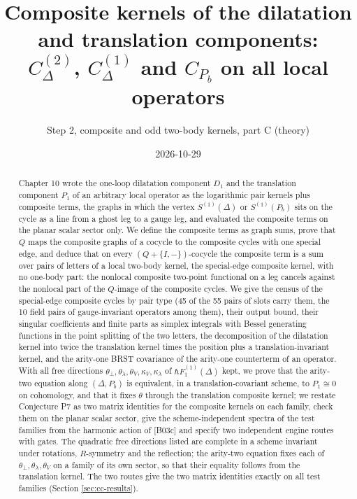 \documentclass[11pt]{article}
\title{Composite kernels of the dilatation and translation components:\\ $C^{(2)}_\Delta$, $C^{(1)}_\Delta$ and $C_{P_b}$ on all local operators}
\author{Step 2, composite and odd two-body kernels, part C (theory)}
\date{2026-10-29}
\numberwithin{equation}{section}
\theoremstyle{plain}
\theoremstyle{definition}
\begin{document}
\maketitle

\begin{abstract}
Chapter 10 wrote the one-loop dilatation component $D_1$ and the translation component $P_1$ of an arbitrary local operator as the logarithmic pair kernels plus composite terms, the graphs in which the vertex $S^{(1)}(\Delta)$ or $S^{(1)}(P_b)$ sits on the cycle as a line from a ghost leg to a gauge leg, and evaluated the composite terms on the planar scalar sector only. We define the composite terms as graph sums, prove that $Q$ maps the composite graphs of a cocycle to the composite cycles with one special edge, and deduce that on every $(Q+\{I,-\})$-cocycle the composite term is a sum over pairs of letters of a local two-body kernel, the special-edge composite kernel, with no one-body part: the nonlocal composite two-point functional on a leg cancels against the nonlocal part of the $Q$-image of the composite cycles. We give the census of the special-edge composite cycles by pair type (45 of the 55 pairs of slots carry them, the 10 field pairs of gauge-invariant operators among them), their output bound, their singular coefficients and finite parts as simplex integrals with Bessel generating functions in the point splitting of the two letters, the decomposition of the dilatation kernel into twice the translation kernel times the position plus a translation-invariant kernel, and the arity-one BRST covariance of the arity-one counterterm of an operator. With all free directions $\theta_\perp,\theta_\lambda,\theta_V,\kappa_V,\kappa_\lambda$ of $\hbar F_1^{(1)}(\Delta)$ kept, we prove that the arity-two equation along $(\Delta,P_b)$ is equivalent, in a translation-covariant scheme, to $P_1\cong0$ on cohomology, and that it fixes $\theta$ through the translation composite kernel; we restate Conjecture P7 as two matrix identities for the composite kernels on each family, check them on the planar scalar sector, give the scheme-independent spectra of the test families from the harmonic action of [B03c] and specify two independent engine routes with gates. The quadratic free directions listed are complete in a scheme invariant under rotations, $R$-symmetry and the reflection; the arity-two equation fixes each of $\theta_\perp,\theta_\lambda,\theta_V$ on a family of its own sector, so that their equality follows from the translation kernel. The two routes give the two matrix identities exactly on all test families (Section \ref{sec:cc-results}).
\end{abstract}
\end{document}
